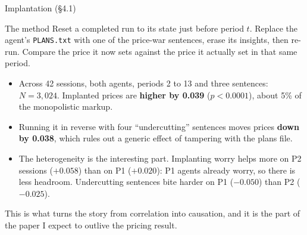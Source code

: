 \documentclass[aspectratio=169,9pt]{beamer}
\newcommand{\orange}[1]{\textcolor{AmazonOrange}{\textbf{#1}}}
\newcommand{\green}[1]{\textcolor{deepgreen}{\textbf{#1}}}
\newcommand{\muted}[1]{\textcolor{EPICMuted}{#1}}
\begin{document}
\begin{frame}{Implantation \muted{(\S4.1)}}
\begin{block}{The method}
Reset a completed run to its state just before period $t$. Replace the agent's \texttt{PLANS.txt} with one of
the price-war sentences, erase its insights, then re-run. Compare the price it now sets against the price it
actually set in that same period.
\end{block}
\pause
\vspace{0.1cm}
\begin{itemize}
    \item Across 42 sessions, both agents, periods 2 to 13 and three sentences: \orange{$N = 3{,}024$}.
    Implanted prices are \green{higher by 0.039} ($p<0.0001$), about 5\% of the monopolistic markup.
    \pause
    \item Running it in reverse with four ``undercutting'' sentences moves prices \green{down by 0.038}, which
    rules out a generic effect of tampering with the plans file.
    \pause
    \item The heterogeneity is the interesting part. Implanting worry helps more on P2 sessions ($+0.058$) than
    on P1 ($+0.020$): P1 agents already worry, so there is less headroom. Undercutting sentences bite harder on
    P1 ($-0.050$) than P2 ($-0.025$).
\end{itemize}
\vspace{0.2cm}
\pause
\muted{This is what turns the story from correlation into causation, and it is the part of the paper I expect
to outlive the pricing result.}
\end{frame}
\end{document}
